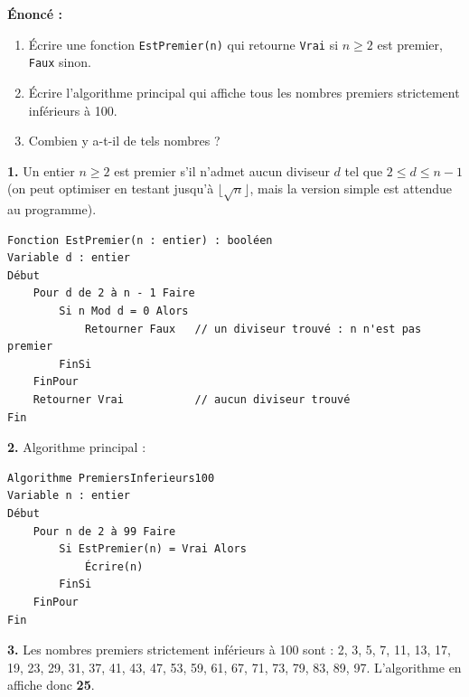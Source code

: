 \documentclass[11pt]{article}
\begin{document}
\begin{corrige}
\textbf{Énoncé :}
\begin{enumerate}
  \item Écrire une fonction \texttt{EstPremier(n)} qui retourne \texttt{Vrai} si $n \ge 2$ est premier, \texttt{Faux} sinon.
  \item Écrire l'algorithme principal qui affiche tous les nombres premiers strictement inférieurs à 100.
  \item Combien y a-t-il de tels nombres ?
\end{enumerate}
\tcblower
\textbf{1.} Un entier $n \geq 2$ est premier s'il n'admet aucun diviseur $d$ tel que $2 \leq d \leq n - 1$ (on peut optimiser en testant jusqu'à $\lfloor\sqrt{n}\rfloor$, mais la version simple est attendue au programme).

\begin{lstlisting}
Fonction EstPremier(n : entier) : booléen
Variable d : entier
Début
    Pour d de 2 à n - 1 Faire
        Si n Mod d = 0 Alors
            Retourner Faux   // un diviseur trouvé : n n'est pas premier
        FinSi
    FinPour
    Retourner Vrai           // aucun diviseur trouvé
Fin
\end{lstlisting}

\textbf{2.} Algorithme principal :

\begin{lstlisting}
Algorithme PremiersInferieurs100
Variable n : entier
Début
    Pour n de 2 à 99 Faire
        Si EstPremier(n) = Vrai Alors
            Écrire(n)
        FinSi
    FinPour
Fin
\end{lstlisting}

\textbf{3.} Les nombres premiers strictement inférieurs à 100 sont :
2, 3, 5, 7, 11, 13, 17, 19, 23, 29, 31, 37, 41, 43, 47, 53, 59, 61, 67, 71, 73, 79, 83, 89, 97.
L'algorithme en affiche donc \textbf{25}.
\end{corrige}
\end{document}
